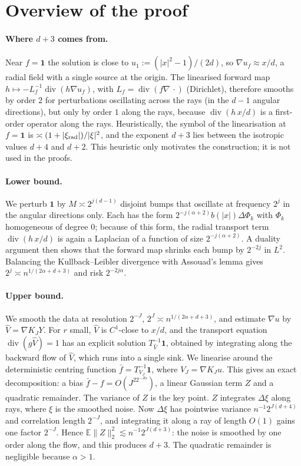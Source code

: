 \documentclass[11pt]{article}
\theoremstyle{definition}
\theoremstyle{remark}
\newcommand{\E}{\mathbb E}
\newcommand{\one}{\mathbf 1}
\newcommand{\dv}{\operatorname{div}}
\begin{document}
\section{Overview of the proof}

\paragraph{Where $d+3$ comes from.} Near $f=\one$ the solution is close to $u_1:=(|x|^2-1)/(2d)$, so $\nabla u_f\approx x/d$, a radial field with a single source at the origin. The linearised forward map $h\mapsto -L_f^{-1}\dv(h\nabla u_f)$, with $L_f=\dv(f\nabla\,\cdot)$ (Dirichlet), therefore smooths by order $2$ for perturbations oscillating across the rays (in the $d-1$ angular directions), but only by order $1$ along the rays, because $\dv(h\,x/d)$ is a first-order operator along the rays. Heuristically, the symbol of the linearisation at $f=\one$ is $\asymp(1+|\xi_{\rm rad}|)/|\xi|^2$, and the exponent $d+3$ lies between the isotropic values $d+4$ and $d+2$. This heuristic only motivates the construction; it is not used in the proofs.

\paragraph{Lower bound.} We perturb $\one$ by $M\asymp2^{j(d-1)}$ disjoint bumps that oscillate at frequency $2^j$ in the angular directions only. Each has the form $2^{-j(\alpha+2)}b(|x|)\Delta\Phi_k$ with $\Phi_k$ homogeneous of degree $0$; because of this form, the radial transport term $\dv(h\,x/d)$ is again a Laplacian of a function of size $2^{-j(\alpha+2)}$. A duality argument then shows that the forward map shrinks each bump by $2^{-2j}$ in $L^2$. Balancing the Kullback--Leibler divergence with Assouad's lemma gives $2^j\asymp n^{1/(2\alpha+d+3)}$ and risk $2^{-2j\alpha}$.

\paragraph{Upper bound.} We smooth the data at resolution $2^{-J}$, $2^J\asymp n^{1/(2\alpha+d+3)}$, and estimate $\nabla u$ by $\hat V=\nabla K_JY$. For $r$ small, $\hat V$ is $C^1$-close to $x/d$, and the transport equation $\dv(g\hat V)=1$ has an explicit solution $T^{-1}_{\hat V}\one$, obtained by integrating along the backward flow of $\hat V$, which runs into a single sink. We linearise around the deterministic centring function $\bar f=T^{-1}_{V_J}\one$, where $V_J=\nabla K_Ju$. This gives an exact decomposition: a bias $\bar f-f=O(J^22^{-J\alpha})$, a linear Gaussian term $Z$ and a quadratic remainder. The variance of $Z$ is the key point. $Z$ integrates $\Delta\xi$ along rays, where $\xi$ is the smoothed noise. Now $\Delta\xi$ has pointwise variance $n^{-1}2^{J(d+4)}$ and correlation length $2^{-J}$, and integrating it along a ray of length $O(1)$ gains one factor $2^{-J}$. Hence $\E\|Z\|_2^2\lesssim n^{-1}2^{J(d+3)}$: the noise is smoothed by one order along the flow, and this produces $d+3$. The quadratic remainder is negligible because $\alpha>1$.
\end{document}
